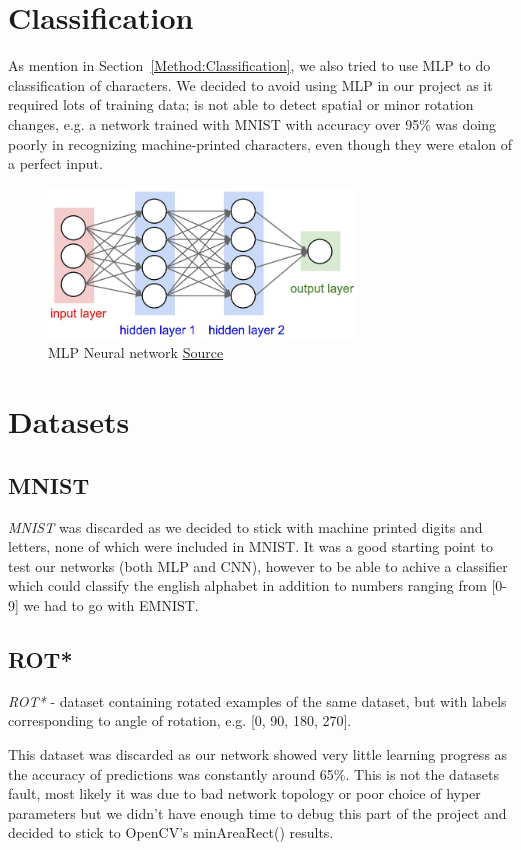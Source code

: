 \documentclass[Report.tex]{subfiles}
\begin{document}
\section{Classification}
\label{sec:Discarded Method:Classification}
\begin{flushleft}
  As mention in Section~\ref{Method:Classification}, we also tried to use MLP to do classification of characters.
  We decided to avoid using MLP in our project as it required lots of training data; is not able to detect spatial or minor rotation changes, e.g. a network trained with MNIST with accuracy over 95\% was doing poorly in recognizing machine-printed characters, even though they were etalon of a perfect input.

  \begin{figure}[H]
    \centering
    \includegraphics[height=4cm]{res/neural_net2.jpeg}
    \caption{MLP Neural network \href{http://cs231n.github.io/neural-networks-1/}{Source}}
    \label{fig:neural_net2}
  \end{figure}

\end{flushleft}

\section{Datasets}
\label{sec:Datasets}
\subsection{MNIST}
\textit{MNIST} was discarded as we decided to stick with machine printed digits and letters, none of which were included in MNIST. It was a good starting point to test our networks (both MLP and CNN), however to be able to achive a classifier which could classify the english alphabet in addition to numbers ranging from [0-9] we had to go with EMNIST.

\subsection{ROT*}
\textit{ROT*} - dataset containing rotated examples of the same dataset, but with labels corresponding to angle of rotation, e.g. [0, 90, 180, 270]. \par
This dataset was discarded as our network showed very little learning progress as the accuracy of predictions was constantly around 65\%. This is not the datasets fault, most likely it was due to bad network topology or poor choice of hyper parameters but we didn't have enough time to debug this part of the project and decided to stick to OpenCV's minAreaRect() results.
\end{document}
